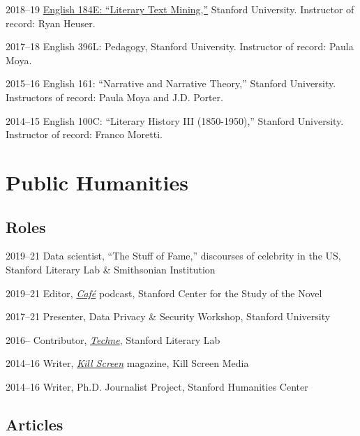 \documentclass[12pt,letterpaper]{report}
\begin{document}
\begin{tablist}
	\item[2018--19] \tab{}\href{https://fredner.org/teaching}{English 184E: \enquote{Literary Text Mining,}} Stanford University. Instructor of record: Ryan Heuser.
	\item[2017--18] \tab{}English 396L: Pedagogy, Stanford University. Instructor of record: Paula Moya.
	\item[2015--16] \tab{}English 161: \enquote{Narrative and Narrative Theory,} Stanford University. Instructors of record: Paula Moya and J.D. Porter.
	\item[2014--15] \tab{}English 100C: \enquote{Literary History III (1850-1950),} Stanford University. Instructor of record: Franco Moretti.
\end{tablist}

\section*{Public Humanities}

\subsection*{Roles}

\begin{tablist}
	\item[2019--21] \tab{}Data scientist, \enquote{The Stuff of Fame,} discourses of celebrity in the US, Stanford Literary Lab \& Smithsonian Institution
	\item[2019--21] \tab{}Editor, \href{https://novel.stanford.edu/csn-cafe}{\emph{Café}} podcast, Stanford Center for the Study of the Novel
	\item[2017--21] \tab{}Presenter, Data Privacy \& Security Workshop, Stanford University
	\item[2016--] \tab{}Contributor, \href{https://litlab.stanford.edu/techne/}{\emph{Techne}}, Stanford Literary Lab
	\item[2014--16] \tab{}Writer, \href{https://web.archive.org/web/20221003115514/https://killscreen.com/previously/author/erik-fredner/}{\emph{Kill Screen}} magazine, Kill Screen Media
	\item[2014--16] \tab{}Writer, Ph.D. Journalist Project, Stanford Humanities Center
\end{tablist}

\subsection*{Articles}
\end{document}
